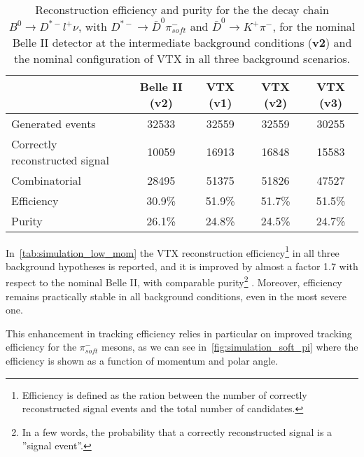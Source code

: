 \begin{table}[htbp]
  \begin{center}
    \begin{tabular}{l|c|c|c|c}
      \hline\hline
      & Belle II (v2) & VTX (v1) & VTX (v2) & VTX (v3) \\
      \hline\hline
      Generated events & 32533 & 32559 & 32559 & 30255 \\
      \hline
      Correctly reconstructed signal & 10059 & 16913 & 16848 & 15583 \\
      \hline
      Combinatorial & 28495 & 51375 & 51826 & 47527 \\
      \hline\hline
      Efficiency & 30.9\% & 51.9\% & 51.7\% & 51.5\% \\
      \hline
      Purity & 26.1\% & 24.8\% & 24.5\% & 24.7\% \\
      \hline\hline
    \end{tabular}
  \end{center}
   \caption{Reconstruction efficiency and purity for the the decay chain $B^{0} \rightarrow D^{*-}l^{+}\nu$, with $D^{*-} \rightarrow \bar{D}^{0} \pi^{-}_{soft}$ and $\bar{D}^{0} \rightarrow K^{+} \pi^{-}$, for the nominal Belle II detector at the intermediate background conditions (\textbf{v2}) and the nominal configuration of VTX in all three background scenarios.}
\label{tab:simulation_low_mom}
\end{table}


In~\autoref{tab:simulation_low_mom} the VTX reconstruction efficiency\footnote{Efficiency is defined as the ration between the number of correctly reconstructed signal events and the total number of candidates.}  in all three background hypotheses is reported, and it is improved by almost a factor 1.7 with respect to the nominal Belle II, with comparable purity\footnote{In a few words, the probability that a correctly reconstructed signal  is a ''signal event''.} . Moreover, efficiency remains practically stable in all background conditions, even in the most severe one.

This enhancement in tracking efficiency relies in particular on improved tracking efficiency for the $\pi_{soft}^{-}$ mesons, as we can see in~\autoref{fig:simulation_soft_pi} where the efficiency is shown as a function of momentum and polar angle.


